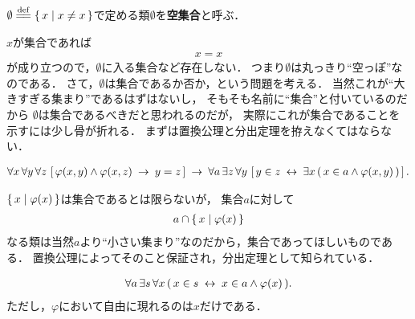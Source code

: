 	\begin{screen}
		\begin{dfn}[空集合]
			$\emptyset \defeq \Set{x}{x \neq x}$で定める類$\emptyset$を{\bf 空集合}と呼ぶ．
		\end{dfn}
	\end{screen}
	
	$x$が集合であれば
	\begin{align}
		x = x
	\end{align}
	が成り立つので，$\emptyset$に入る集合など存在しない．
	つまり$\emptyset$は丸っきり``空っぽ''なのである．
	さて，$\emptyset$は集合であるか否か，という問題を考える．
	当然これが``大きすぎる集まり''であるはずはないし，
	そもそも名前に``集合''と付いているのだから
	$\emptyset$は集合であるべきだと思われるのだが，
	実際にこれが集合であることを示すには少し骨が折れる．
	まずは置換公理と分出定理を拵えなくてはならない．
	
	\begin{screen}
		\begin{axm}[置換公理]
			\begin{align}
				\forall x\, \forall y\, \forall z\, 
				\left[\, \varphi(x,y) \wedge \varphi(x,z)
				\hspace{0.25em}\rightarrow\hspace{0.25em} y = z\, \right]
				\hspace{0.25em}\rightarrow\hspace{0.25em} \forall a\, \exists z\, \forall y\,
				\left[\, y \in z \hspace{0.25em}\leftrightarrow\hspace{0.25em} \exists x\, (\, x \in a \wedge 
				\varphi(x,y)\, )\, \right].
			\end{align}
		\end{axm}
	\end{screen}
	
	$\left\{\, x \mid \varphi(x)\, \right\}$は集合であるとは限らないが，
	集合$a$に対して
	\begin{align}
		a \cap \left\{\, x \mid \varphi(x)\, \right\}
	\end{align}
	なる類は当然$a$より``小さい集まり''なのだから，集合であってほしいものである．
	置換公理によってそのこと保証され，分出定理として知られている．
	
	\begin{screen}
		\begin{thm}[分出定理]
			\begin{align}
				\forall a\, \exists s\, \forall x\,
				(\, x \in s \hspace{0.25em}\leftrightarrow\hspace{0.25em} x \in a \wedge \varphi(x)\, ).
			\end{align}
			ただし，$\varphi$において自由に現れるのは$x$だけである．
		\end{thm}
	\end{screen}
	
